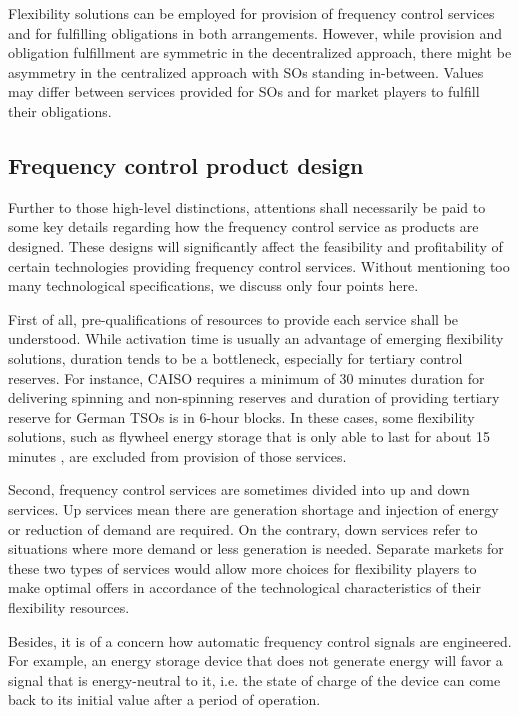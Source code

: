 Flexibility solutions can be employed for provision of frequency control services and for fulfilling obligations in both arrangements. However, while provision and obligation fulfillment are symmetric in the decentralized approach, there might be asymmetry in the centralized approach with SOs standing in-between. Values may differ between services provided for SOs and for market players to fulfill their obligations.

\subsection{Frequency control product design}
Further to those high-level distinctions, attentions shall necessarily be paid to some key details regarding how the frequency control service as products are designed. These designs will significantly affect the feasibility and profitability of certain technologies providing frequency control services. Without mentioning too many technological specifications, we discuss only four points here. 

First of all, pre-qualifications of resources to provide each service shall be understood. While activation time is usually an advantage of emerging flexibility solutions, duration tends to be a bottleneck, especially for tertiary control reserves. For instance, CAISO requires a minimum of 30 minutes duration for delivering spinning and non-spinning reserves and duration of providing tertiary reserve for German TSOs is in 6-hour blocks. In these cases, some flexibility solutions, such as flywheel energy storage that is only able to last for about 15 minutes \cite{EllisonJ.F.TesfatsionL.S.LooseV.W.Byrne2012,Beaudin2014}, are excluded from provision of those services.

Second, frequency control services are sometimes divided into up and down services. Up services mean there are generation shortage and injection of energy or reduction of demand are required. On the contrary, down services refer to situations where more demand or less generation is needed. Separate markets for these two types of services would allow more choices for flexibility players to make optimal offers in accordance of the technological characteristics of their flexibility resources.

Besides, it is of a concern how automatic frequency control signals are engineered. For example, an energy storage device that does not generate energy will favor a signal that is energy-neutral to it, i.e. the state of charge of the device can come back to its initial value after a period of operation.

